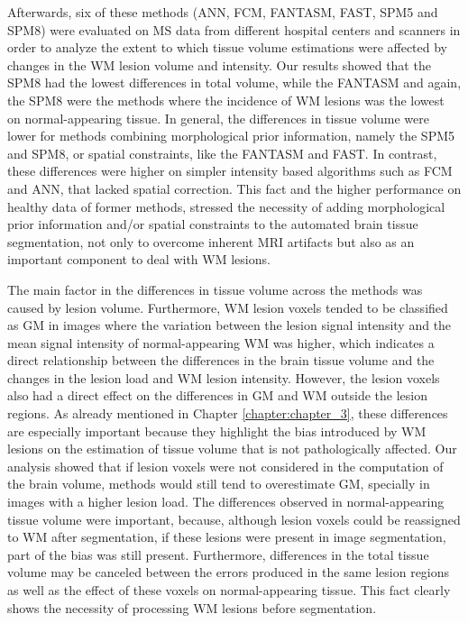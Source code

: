 Afterwards, six of these methods (ANN, FCM, FANTASM, FAST, SPM5 and SPM8) were evaluated on MS data from different hospital centers and scanners in order to analyze the extent to which tissue volume estimations were affected by changes in the WM lesion volume and intensity. Our results showed that the SPM8 had the lowest differences in total volume, while the FANTASM and again, the SPM8 were the methods where the incidence of WM lesions was the lowest on normal-appearing tissue. In general, the differences in tissue volume were lower for methods combining morphological prior information, namely the SPM5 and SPM8, or spatial constraints, like the FANTASM and FAST. In contrast, these differences were higher on simpler intensity based algorithms such as FCM and ANN, that lacked spatial correction. This fact and the higher performance on healthy data of former methods, stressed the necessity of adding morphological prior information and/or spatial constraints to the automated brain tissue segmentation, not only to overcome inherent MRI artifacts but also as an important component to deal with WM lesions.

The main factor in the differences in tissue volume across the methods was caused by lesion volume. Furthermore, WM lesion voxels tended to be classified as GM in images where the variation between the lesion signal intensity and the mean signal intensity of normal-appearing WM was higher, which indicates a direct relationship between the differences in the brain tissue volume and the changes in the lesion load and WM lesion intensity. However, the lesion voxels also had a direct effect on the differences in GM and WM outside the lesion regions. As already mentioned in Chapter \ref{chapter:chapter_3}, these differences are especially important because they highlight the bias introduced by WM lesions on the estimation of tissue volume that is not pathologically affected. Our analysis showed that if lesion voxels were not considered in the computation of the brain volume, methods would still tend to overestimate GM, specially in images with a higher lesion load. The  differences observed in normal-appearing tissue volume were important, because, although lesion voxels could be reassigned to WM after segmentation, if these lesions were present in image segmentation, part of the bias was still present. Furthermore, differences in the total tissue volume may be canceled between the errors produced in the same lesion regions as well as the effect of these voxels on normal-appearing tissue. This fact clearly shows the necessity of processing WM lesions before segmentation.


